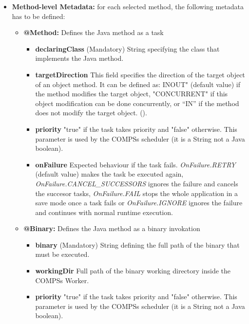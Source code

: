 \begin{itemize}
 \item \textbf{Method-level Metadata:} for each selected method, the following metadata has to be defined:
       \begin{itemize}
         \item \textbf{@Method:} Defines the Java method as a task 
		\begin{itemize}
		        \item \textbf{declaringClass} (Mandatory) String specifying the class that implements the Java method.
			\item \textbf{targetDirection} This field specifies the direction of the target object of an object method. It can be defined as: INOUT" (default value) if the method modifies the target object, "CONCURRENT" if this object modification can be done concurrently, or ``IN'' if the method does not modify the target object.
			().
			\item \textbf{priority} "true" if the task takes priority and "false" otherwise. This parameter is used
			by the COMPSs scheduler (it is a String not a Java boolean).
			\item \textbf{onFailure} Expected behaviour if the task fails. \textit{OnFailure.RETRY} (default value) makes the task be executed again, 
			\textit{OnFailure.CANCEL\_SUCCESSORS} ignores the failure and cancels the succesor tasks, \textit{OnFailure.FAIL} stops the whole application in a save mode once a task fails or 
			\textit{OnFailure.IGNORE} ignores the failure and continues with normal runtime execution.
		\end{itemize}
		
	 \item \textbf{@Binary:} Defines the Java method as a binary invokation
	        \begin{itemize}
		        \item \textbf{binary} (Mandatory) String defining the full path of the binary that must be executed.
			\item \textbf{workingDir} Full path of the binary working directory inside the COMPSs Worker.
			\item \textbf{priority} "true" if the task takes priority and "false" otherwise. This parameter is used
			by the COMPSs scheduler (it is a String not a Java boolean).
		\end{itemize}
		

\end{itemize}
\end{itemize}
